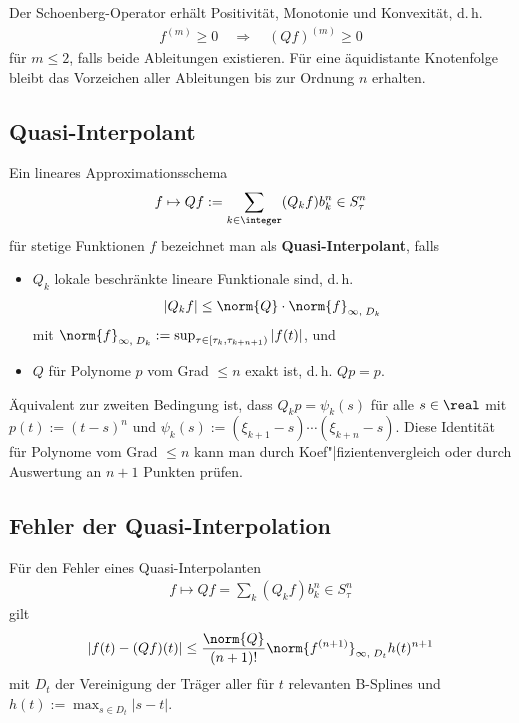 Der Schoenberg-Operator erhält Positivität, Monotonie und Konvexität, d.\,h.
\begin{align*}
    f^{(m)} \ge 0 \quad\Rightarrow\quad
    (Qf)^{(m)} \ge 0
\end{align*}
für $m \le 2$, falls beide Ableitungen existieren.
Für eine äquidistante Knotenfolge bleibt das Vorzeichen aller Ableitungen
bis zur Ordnung $n$ erhalten.

\subsection{%
    Quasi-Interpolant%
}

Ein lineares Approximationsschema
\begin{align*}
    f \mapsto Qf := \sum_{k \in \integer} (Q_k f) b_k^n \in S_\tau^n
\end{align*}
für stetige Funktionen $f$ bezeichnet man als \textbf{Quasi-Interpolant}, falls
\begin{itemize}
    \item
    $Q_k$ lokale beschränkte lineare Funktionale sind, d.\,h.
    \begin{align*}
        |Q_k f| \le \norm{Q} \cdot \norm{f}_{\infty,\; D_k}
    \end{align*}
    mit $\norm{f}_{\infty,\; D_k} :=
    \sup_{\tau \in [\tau_k, \tau_{k+n+1})} |f(t)|$, und

    \item
    $Q$ für Polynome $p$ vom Grad $\le n$ exakt ist, d.\,h. $Qp = p$.
\end{itemize}
Äquivalent zur zweiten Bedingung ist, dass $Q_k p = \psi_k(s)$ für alle
$s \in \real$ mit $p(t) := (t - s)^n$ und
$\psi_k(s) := (\xi_{k+1} - s) \dotsm (\xi_{k+n} - s)$.
Diese Identität für Polynome vom Grad $\le n$ kann man durch
Koef"|fizientenvergleich oder durch Auswertung an $n + 1$ Punkten prüfen.

\subsection{%
    Fehler der Quasi-Interpolation%
}

Für den Fehler eines Quasi-Interpolanten
\begin{align*}
    f \mapsto Qf = \sum_k (Q_k f) b_k^n \in S_\tau^n
\end{align*}
gilt
\begin{align*}
    |f(t) - (Qf)(t)| \le \frac{\norm{Q}}{(n + 1)!}
    \norm{f^{(n+1)}}_{\infty,\; D_t} h(t)^{n+1}
\end{align*}
mit $D_t$ der Vereinigung der Träger aller für $t$ relevanten B-Splines
und $h(t) := \max_{s \in D_t} |s - t|$.

